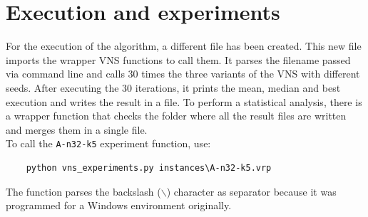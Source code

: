 \documentclass[11pt]{article}
\begin{document}
\section{Execution and experiments}

For the execution of the algorithm, a different file has been created. This new file imports the wrapper VNS functions to call them. It parses the filename passed via command line and calls 30 times the three variants of the VNS with different seeds. After executing the 30 iterations, it prints the mean, median and best execution and writes the result in a file. To perform a statistical analysis, there is a wrapper function that checks the folder where all the result files are written and merges them in a single file.\\

To call the \texttt{A-n32-k5} experiment function, use: 
\begin{verbatim}
	python vns_experiments.py instances\A-n32-k5.vrp
\end{verbatim}

The function parses the backslash ($\backslash$) character as separator because it was programmed for a Windows environment originally. 
\end{document}
